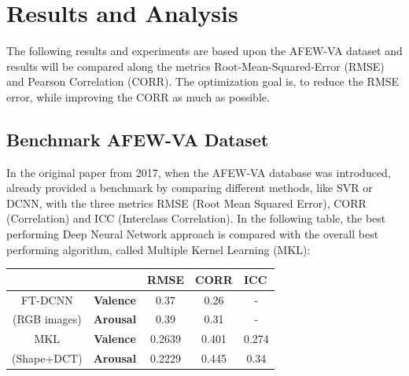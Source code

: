 \chapter{Results and Analysis}
The following results and experiments are based upon the AFEW-VA dataset and results will be compared along the metrics Root-Mean-Squared-Error (RMSE) and Pearson Correlation (CORR). The optimization goal is, to reduce the RMSE error, while improving the CORR as much as possible.

\section{Benchmark AFEW-VA Dataset}
In the original paper from 2017, when the AFEW-VA database \citep{Kossaifi:2017:AFEW-VADatabase} was introduced, \citet{Kossaifi:2017:AFEW-VADatabase} already provided a benchmark by comparing different methods, like SVR or DCNN, with the three metrics RMSE (Root Mean Squared Error), CORR (Correlation) and ICC (Interclass Correlation). In the following table, the best performing Deep Neural Network approach is compared with the overall best performing algorithm, called Multiple Kernel Learning (MKL):

\begin{table}[H]
\centering
\begin{tabular}{cc|ccc}
\multicolumn{1}{l}{} & \multicolumn{1}{l|}{\textbf{}} & \multicolumn{1}{l}{\cellcolor[HTML]{CBCEFB}\textbf{RMSE}} & \multicolumn{1}{l}{\cellcolor[HTML]{CBCEFB}\textbf{CORR}} & \multicolumn{1}{l}{\cellcolor[HTML]{CBCEFB}\textbf{ICC}} \\ \hline
FT-DCNN & \cellcolor[HTML]{F8FF00}\textbf{Valence} & 0.37 & 0.26 & - \\
(RGB images) & \cellcolor[HTML]{F8FF00}\textbf{Arousal} & 0.39 & 0.31 & - \\ \hline
MKL & \cellcolor[HTML]{F8FF00}\textbf{Valence} & 0.2639 & 0.401 & 0.274 \\
(Shape+DCT) & \cellcolor[HTML]{F8FF00}\textbf{Arousal} & 0.2229 & 0.445 & 0.34
\end{tabular}
\end{table}

